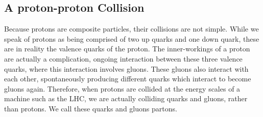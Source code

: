 \vspace{5mm}

\subsection{A \textbf{proton-proton} Collision}

Because protons are composite particles, their collisions are not simple. While we speak of protons as being comprised of two up quarks and one down quark, these are in reality the valence quarks of the proton. The inner-workings of a proton are actually a complication, ongoing interaction between these three valence quarks, where this interaction involves gluons. These gluons also interact with each other, spontaneously producing different quarks which interact to become gluons again. Therefore, when protons are collided at the energy scales of a machine such as the LHC, we are actually colliding quarks and gluons, rather than protons. We call these quarks and gluons partons.


